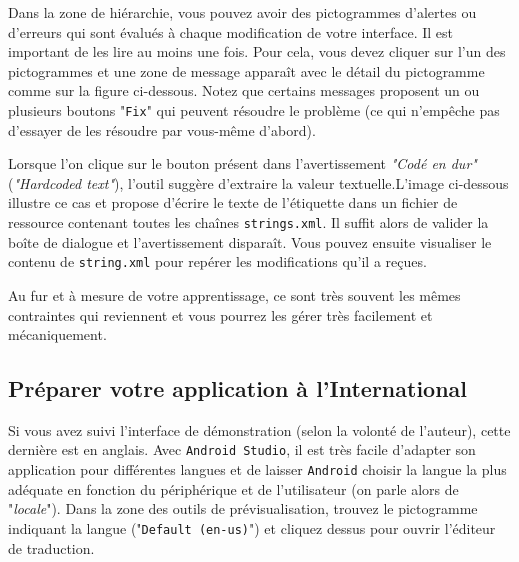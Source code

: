 \documentclass[a4paper,10pt]{article}
\newenvironment{attention}%
{\begin{tcolorbox}[breakable,colback=green!25!white,colframe=red!55!black,title=Attention]}%
{\end{tcolorbox}}
\begin{document}
\begin{attention}
	Dans la zone de hiérarchie, vous pouvez avoir des pictogrammes d'alertes ou d'erreurs qui sont évalués à chaque modification de votre interface. Il est important de les lire au moins une fois. Pour cela, vous devez cliquer sur l'un des pictogrammes et une zone de message apparaît avec le détail du pictogramme comme sur la figure ci-dessous. Notez que certains messages proposent un ou plusieurs boutons "\texttt{Fix}" qui peuvent résoudre le problème (ce qui n'empêche pas d'essayer de les résoudre par vous-même d'abord).
	
	\begin{center}
	\end{center}

	Lorsque l'on clique sur le bouton présent dans l'avertissement \textit{"Codé en dur"} (\textit{"Hardcoded text"}), l'outil suggère d'extraire la valeur textuelle.L'image ci-dessous illustre ce cas et propose d'écrire le texte de l'étiquette dans un fichier de ressource contenant toutes les chaînes  \texttt{strings.xml}. Il suffit alors de valider la boîte de dialogue et l'avertissement disparaît. Vous pouvez ensuite visualiser le contenu de \texttt{string.xml} pour repérer les modifications qu'il a reçues.
	
	Au fur et à mesure de votre apprentissage, ce sont très souvent les mêmes contraintes qui reviennent et vous pourrez les gérer très facilement et mécaniquement.
	
\begin{center}
\end{center}

\end{attention}
	

\subsection{Préparer votre application à l'International}

Si vous avez suivi l'interface de démonstration (selon la volonté de l'auteur), cette dernière est en anglais. Avec \texttt{Android Studio}, il est très facile d'adapter son application pour différentes langues et de laisser \texttt{Android} choisir la langue la plus adéquate en fonction du périphérique et de l'utilisateur (on parle alors de "\textit{locale}"). Dans la zone des outils de prévisualisation, trouvez le pictogramme indiquant la langue ("\texttt{Default (en-us)}") et cliquez dessus pour ouvrir l'éditeur de traduction.
\begin{center}
\end{center}
\end{document}
